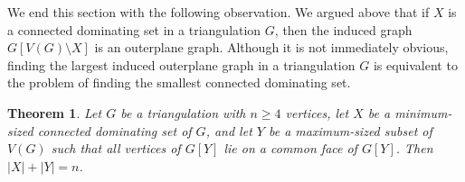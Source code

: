 \documentclass[11pt]{article}
\newcommand{\pat}[1]{\textcolor{red}{PM: #1}}
\newtheorem{thm}{Theorem}
\theoremstyle{definition}
\begin{document}




We end this section with the following observation. We argued above that if $X$ is a connected dominating set in a triangulation $G$, then the induced graph $G[V(G)\setminus X]$ is an outerplane graph.  Although it is not immediately obvious, finding the largest induced outerplane graph in a triangulation $G$ is equivalent to the problem of finding the smallest connected dominating set.

\begin{thm}
  Let $G$ be a triangulation with $n\ge 4$ vertices, let $X$ be a minimum-sized connected dominating set of $G$, and let $Y$ be a maximum-sized subset of $V(G)$ such that all vertices of $G[Y]$ lie on a common face of $G[Y]$. Then $|X|+|Y|=n$.
\end{thm}
\end{document}
